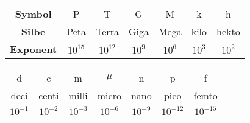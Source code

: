     \begin{tabular}{c c c c c c c}
        \textbf{Symbol}     & P         & T         & G         & M         & k         & h   \\
        \textbf{Silbe}      & Peta      & Terra     & Giga      & Mega      & kilo      & hekto \\
        \textbf{Exponent}   & $10^{15}$ & $10^{12}$ & $10^9$    & $10^6$    & $10^3$    & $10^2$
    \end{tabular}
    \begin{tabular}{c c c c c c c c}
        d         & c         & m         & $\mu$         & n         & p           & f \\
        deci      & centi     & milli     & micro         & nano      & pico        & femto \\
        $10^{-1}$ & $10^{-2}$ & $10^{-3}$ & $10^{-6}$     & $10^{-9}$ & $10^{-12}$  & $10^{-15}$
    \end{tabular}
